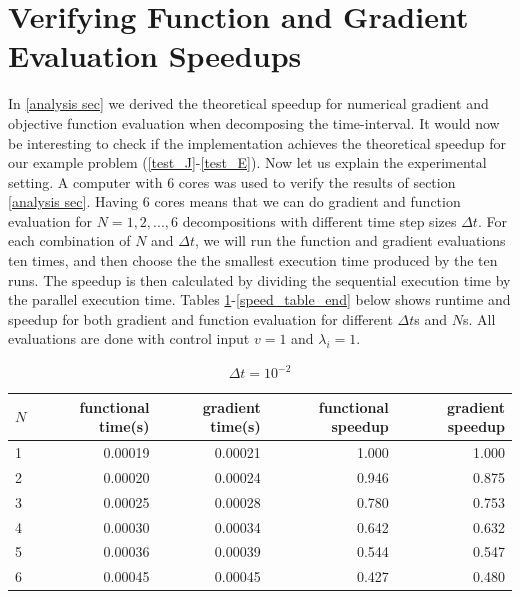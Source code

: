 \section{Verifying Function and Gradient Evaluation Speedups} \label{ver S sec}
In \ref{analysis sec} we derived the theoretical speedup for numerical gradient and objective function evaluation when decomposing the time-interval. It would now be interesting to check if the implementation achieves the theoretical speedup for our example problem (\ref{test_J}-\ref{test_E}). Now let us explain the experimental setting. A computer with 6 cores was used to verify the results of section \ref{analysis sec}. Having 6 cores means that we can do gradient and function evaluation for $N=1,2,...,6$ decompositions with different time step sizes $\Delta t$. For each combination of $N$ and $\Delta t$, we will run the function and gradient evaluations ten times, and then choose the the smallest execution time produced by the ten runs. The speedup is then calculated by dividing the sequential execution time by the parallel execution time. Tables \ref{Speed_table1}-\ref{speed_table_end} below shows runtime and speedup for both gradient and function evaluation for different $\Delta t$s and $N$s. All evaluations are done with control input $v=1$ and $\lambda_i=1$.  
\\
\begin{table}[!h]
\centering
\caption{$\Delta t=10^{-2}$}
\label{Speed_table1}
\begin{tabular}{lrrrr}
\toprule
{}$N$ &  functional time(s) &  gradient time(s) &  functional speedup &  gradient speedup \\
\midrule
1 &           0.00019 &          0.00021 &            1.000 &          1.000 \\
2 &           0.00020 &          0.00024 &            0.946 &          0.875 \\
3 &           0.00025 &          0.00028 &            0.780 &          0.753 \\
4 &           0.00030 &          0.00034 &            0.642 &          0.632 \\
5 &           0.00036 &          0.00039 &            0.544 &          0.547 \\
6 &           0.00045 &          0.00045 &            0.427 &          0.480 \\
\bottomrule
\end{tabular}
\end{table}
